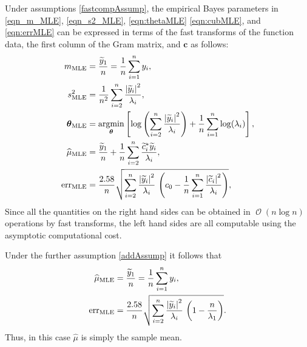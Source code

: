 \documentclass{iitthesis}          %
\DeclareMathOperator{\Order}{{\mathcal O}}
\newcommand{\bm}[1]{\boldsymbol{#1}}
\newcommand{\vtheta}{{\bm{\theta}}}
\newcommand{\vc}{\bm{c}}
\newcommand{\hmu}{\widehat{\mu}}
\newcommand{\MLE}{\textup{MLE}}
\newcommand{\err}{\textup{err}}
\def\abs#1{\ensuremath{\left \lvert #1 \right \rvert}}
\providecommand{\argmin}{\operatorname*{argmin}}
\begin{document}

Under assumptions \eqref{fastcompAssump}, the empirical Bayes parameters in \eqref{eqn_m_MLE}, \eqref{eqn_s2_MLE}, \eqref{eqn:thetaMLE} \eqref{eqn:cubMLE}, and \eqref{eqn:errMLE} can be expressed in terms of the fast transforms of the function data, the first column of the Gram matrix, and $\vc$ as follows:
\begin{align}
\nonumber
m_\MLE &=  \frac{\widetilde{y}_1}{n} = \frac 1n \sum_{i=1}^n y_i,
\\
\nonumber
s^2_\MLE 
& =
\frac{1}{n^2} 
\sum_{i=2}^n \frac{\abs{\widetilde{y}_i}^2}{\lambda_i}, \\
\label{eqn_MLE_loss_func_optimized_2}
\vtheta_\MLE
&= 
\argmin_{\vtheta}
\left[
\log\left(
\sum_{i=2}^n \frac{\abs{\widetilde{y}_i}^2}{\lambda_i}
\right)   + 
\frac{1}{n}\sum_{i=1}^n \log(\lambda_i)
\right],
\\
\nonumber
\hmu_\MLE  &= 
\frac{\widetilde{y}_1}{n} +
\frac 1n \sum_{i=2}^n \frac{ \widetilde{c}_i^* \widetilde{y}_i}{\lambda_i}, \\
\nonumber
\err_\MLE  &
=
\frac{2.58}{n}\sqrt{
	\sum_{i=2}^{n} \frac{\abs{\widetilde{y}_i}^2}{\lambda_i}  
	\,
	\left( c_0 - \frac 1n \sum_{i=1}^n \frac{\abs{\widetilde{c}_i}^2}{\lambda_i} \right) 
},
\end{align}
Since all the quantities on the right hand sides can be obtained in $\Order(n \log n)$ operations by fast transforms, the left hand sides are all computable using the asymptotic computational cost.

Under the further assumption \eqref{addAssump} it follows that 
\begin{align}
\nonumber
\hmu_\MLE  &= 
\frac{\widetilde{y}_1}{n} = \frac 1n \sum_{i=1}^n y_i,\\
\label{eq:errMLEAllAsump}
\err_\MLE  &
=
\frac{2.58}{n}\sqrt{
	\sum_{i=2}^{n} \frac{\abs{\widetilde{y}_i}^2}{\lambda_i}  
	\,
	\left( 1 -  \frac{n}{\lambda_1} \right) 
}.
\end{align}
Thus, in this  case $\hmu$ is simply the sample mean.
\end{document}
